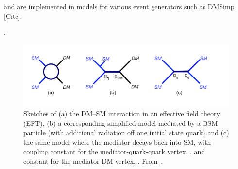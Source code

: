 \begin{marginnote}[]
 and are implemented in models for various event generators such as DMSimp [Cite]. 
\end{marginnote}. 




\begin{figure}[!htpb]
\includegraphics[width=\textwidth]{figures/MonoX.pdf}
\caption{Sketches of (a) the DM--SM interaction in an effective field theory (EFT), (b) a corresponding simplified model mediated by a BSM particle (with additional radiation off one initial state quark) and (c) the same model where the mediator decays back into SM, with coupling constant for the mediator-quark-quark vertex, \gq, and constant for the mediator-DM vertex, \gdm. From~\cite{monoXfig}.}
\label{fig:monoX}
\end{figure}


